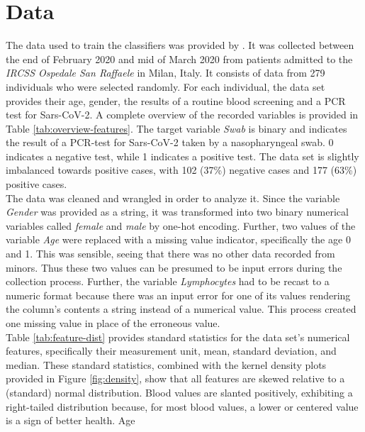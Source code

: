 \label{chap:methods}
\section{Data}
The data used to train the classifiers was provided by 
\citeauthor{RN127} \cite{RN127}. 
It was collected between the end of February 2020 and mid of March 2020 from 
patients admitted to the \textit{IRCSS Ospedale San Raffaele} in Milan, 
Italy. It consists of data from 279 individuals who were selected randomly.
For each individual, the data set provides their age, gender, the results of a 
routine blood screening and a PCR test for Sars-CoV-2.
A complete overview of the recorded variables is provided in Table 
\ref{tab:overview-features}. The target variable \textit{Swab} is binary and 
indicates the result of a PCR-test for Sars-CoV-2 taken by a nasopharyngeal 
swab. 0 indicates a negative test, while 1 indicates a positive test.
The data set is slightly imbalanced towards positive cases, with 102 (37\%) 
negative cases and 177 (63\%) positive cases.
\\
The data was cleaned and wrangled in order to analyze it.
Since the variable \textit{Gender} 
was provided as a string, it was transformed into two binary numerical 
variables called \textit{female} and \textit{male} by one-hot encoding.
Further, two values of the variable \textit{Age} were replaced with a missing 
value indicator, specifically 
the age 0 and 1. This was sensible, seeing that there was no other 
data recorded from minors. Thus these two values can 
be presumed to be input errors during the collection process.
Further, the variable \textit{Lymphocytes} had to be recast to a numeric 
format because there was an input error for one of its 
values rendering the column's contents a string instead of a numerical 
value. This process created one missing value in place of the erroneous value.
\\
Table \ref{tab:feature-dist} provides standard statistics for the data set's 
numerical features, specifically their measurement unit, mean, standard 
deviation, and median.
These standard statistics, combined with the kernel density plots 
provided in Figure \ref{fig:density}, show that all features are skewed 
relative to a (standard) normal distribution. Blood values are 
slanted positively, exhibiting a right-tailed distribution because, for most 
blood values, a lower or centered value is a sign of better health. Age 
